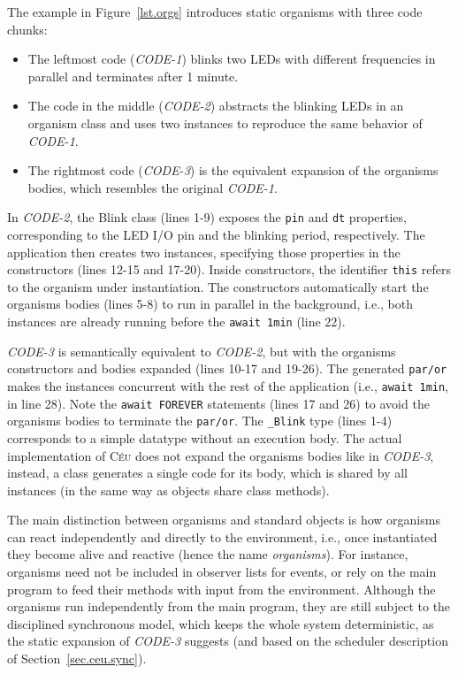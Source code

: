 \documentclass{acm_proc_article-sp}
\newcommand{\CEU}{\textsc{C\'{e}u}\xspace}
\newcommand{\code}[1] {{\small{\texttt{#1}}}}
\newcommand{\1}{\;}
\newcommand{\2}{\;\;}
\newcommand{\3}{\;\;\;}
\newcommand{\5}{\;\;\;\;\;}
\begin{document}
The example in Figure~\ref{lst.orgs} introduces static organisms with three 
code chunks:
%
\begin{itemize}
\item The leftmost code (\emph{CODE-1}) blinks two LEDs with different 
frequencies in parallel and terminates after 1 minute.
%
\item The code in the middle (\emph{CODE-2}) abstracts the blinking LEDs in an 
organism class and uses two instances to reproduce the same behavior of 
\emph{CODE-1}.
%
\item The rightmost code (\emph{CODE-3}) is the equivalent expansion of the 
organisms bodies, which resembles the original \emph{CODE-1}.
\end{itemize}
%
In \emph{CODE-2}, the Blink class (lines 1-9) exposes the \code{pin} and 
\code{dt} properties, corresponding to the LED I/O pin and the blinking period, 
respectively.
The application then creates two instances, specifying those properties in the 
constructors (lines 12-15 and 17-20).
Inside constructors, the identifier \code{this} refers to the organism under 
instantiation.
The constructors automatically start the organisms bodies (lines 5-8) to run in 
parallel in the background, i.e., both instances are already running before the 
\code{await 1min} (line 22).

\emph{CODE-3} is semantically equivalent to \emph{CODE-2}, but with the 
organisms constructors and bodies expanded (lines 10-17 and 19-26).
The generated \code{par/or} makes the instances concurrent with the rest of the 
application (i.e., \code{await 1min}, in line 28).
Note the \code{await FOREVER} statements (lines 17 and 26) to avoid the 
organisms bodies to terminate the \code{par/or}.
The \code{\_Blink} type (lines 1-4) corresponds to a simple datatype without an
execution body.
%
The actual implementation of \CEU does not expand the organisms bodies like in 
\emph{CODE-3}, instead, a class generates a single code for its body, which is 
shared by all instances (in the same way as objects share class methods).

The main distinction between organisms and standard objects is how organisms 
can react independently and directly to the environment, i.e., once 
instantiated they become alive and reactive (hence the name \emph{organisms}).
%
For instance, organisms need not be included in observer lists for events, or 
rely on the main program to feed their methods with input from the environment.
%
Although the organisms run independently from the main program, they are still 
subject to the disciplined synchronous model, which keeps the whole system 
deterministic, as the static expansion of \emph{CODE-3} suggests (and based on 
the scheduler description of Section~\ref{sec.ceu.sync}).
%
\end{document}
